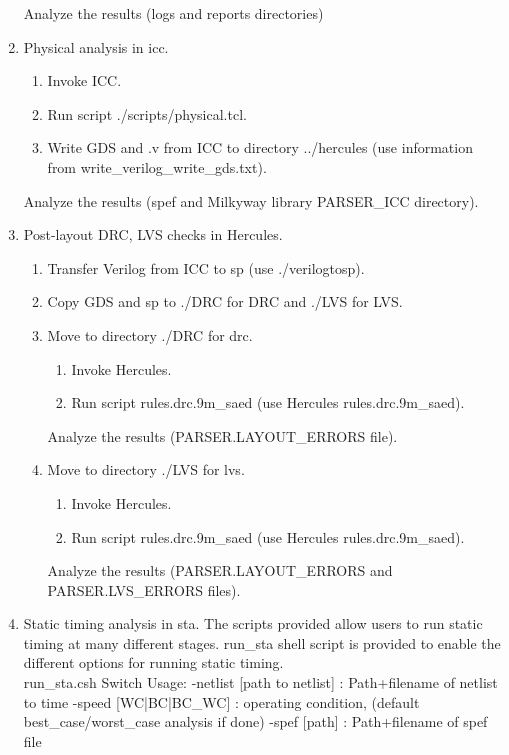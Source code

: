 \documentclass[a4paper,12pt,twoside]{article}
\begin{document}
\begin{enumerate}
    Analyze the results (logs and reports directories)
    \item Physical analysis in icc.
    \begin{enumerate}
        \item Invoke ICC.
        \item Run script ./scripts/physical.tcl.
        \item Write GDS and .v from ICC to directory ../hercules (use information from write\_verilog\_write\_gds.txt).
    \end{enumerate}
    Analyze the results (spef and Milkyway library PARSER\_ICC directory).
    \item Post-layout DRC, LVS checks in Hercules.
    \begin{enumerate}
        \item Transfer Verilog from ICC to sp (use ./verilogtosp).
        \item Copy GDS and sp to ./DRC for DRC and ./LVS for LVS.
        \item Move to directory ./DRC for drc.
        \begin{enumerate}
            \item Invoke Hercules.
            \item Run script rules.drc.9m\_saed (use Hercules rules.drc.9m\_saed).
        \end{enumerate}
        Analyze the results (PARSER.LAYOUT\_ERRORS file).
        \item Move to directory ./LVS for lvs.
        \begin{enumerate}
            \item Invoke Hercules.
            \item Run script rules.drc.9m\_saed (use Hercules rules.drc.9m\_saed).
        \end{enumerate}
        Analyze the results (PARSER.LAYOUT\_ERRORS and PARSER.LVS\_ERRORS files).
    \end{enumerate}
    \item Static timing analysis in sta. The scripts provided allow users to run static timing at many different stages. run\_sta shell script is provided to enable the different options for running static timing.\\
    run\_sta.csh Switch Usage: 
      -netlist [path to netlist]        : Path+filename of netlist to time
      -speed [WC|BC|BC\_WC]             : operating condition, (default best\_case/worst\_case analysis if done)
      -spef [path]                      : Path+filename of spef file

\end{enumerate}
\end{document}
